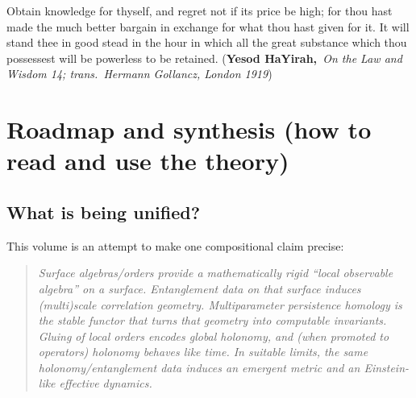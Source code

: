 \documentclass[11pt,oneside]{amsbook}
\numberwithin{equation}{section}
\theoremstyle{plain}
\theoremstyle{definition}
\theoremstyle{remark}
\begin{document}
\fi

Obtain knowledge for thyself, and regret not if its price be high; for thou hast
made the much better bargain in exchange for what thou hast given for it.
It will stand thee in good stead in the hour in which all the great substance
which thou possessest will be powerless to be retained.
(\textbf{Yesod HaYirah,}\emph{\ On the Law and Wisdom 14; trans.\ Hermann Gollancz, London 1919})
\vfill


\tableofcontents
\mainmatter

\chapter*{Roadmap and synthesis (how to read and use the theory)}

\section*{What is being unified?}

This volume is an attempt to make one compositional claim precise:

\begin{quote}
\emph{Surface algebras/orders provide a mathematically rigid ``local observable algebra'' on a surface.
Entanglement data on that surface induces (multi)scale correlation geometry.
Multiparameter persistence homology is the stable functor that turns that geometry into computable invariants.
Gluing of local orders encodes global holonomy, and (when promoted to operators) holonomy behaves like time.
In suitable limits, the same holonomy/entanglement data induces an emergent metric and an Einstein-like effective dynamics.}
\end{quote}
\end{document}
